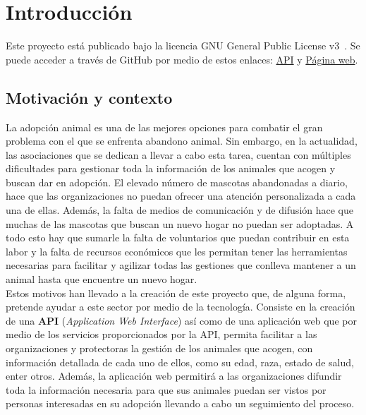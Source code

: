 \chapter{Introducción}\label{ch:introduccion}

Este proyecto está publicado bajo la licencia GNU General Public License v3~\cite{gplv3}.
Se puede acceder a través de GitHub por medio de estos enlaces: \href{https://github.com/Marodseg/confianza-animal-backend}{API}
y \href{https://github.com/Marodseg/confianza-animal-frontend}{Página web}.


\section{Motivación y contexto}\label{sec:motivacion-y-contexto}

La adopción animal es una de las mejores opciones para combatir el gran problema con el que se enfrenta
abandono animal. Sin embargo, en la actualidad, las asociaciones que se dedican a llevar a cabo esta tarea,
cuentan con múltiples dificultades para gestionar toda la información de los animales
que acogen y buscan dar en adopción. El elevado número de mascotas abandonadas a diario, hace que
las organizaciones no puedan ofrecer una atención personalizada a cada una de ellas. Además, la falta de medios
de comunicación y de difusión hace que muchas de las mascotas que buscan un nuevo hogar no
puedan ser adoptadas. A todo esto hay que sumarle la falta de voluntarios que puedan contribuir en esta labor y
la falta de recursos económicos que les permitan tener las herramientas necesarias para facilitar y agilizar
todas las gestiones que conlleva mantener a un animal hasta que encuentre un nuevo hogar. \\

Estos motivos han llevado a la creación de este proyecto que, de alguna forma, pretende ayudar a este sector
por medio de la tecnología. Consiste en la creación de una \textbf{API} (\textit{Application Web Interface}) así como de una aplicación web que por medio de
los servicios proporcionados por la API, permita facilitar a las organizaciones y protectoras la gestión de los
animales que acogen, con información detallada de cada uno de ellos, como su edad, raza, estado de salud, enter otros.
Además, la aplicación web permitirá a las organizaciones difundir toda la información necesaria para que sus animales
puedan ser vistos por personas interesadas en su adopción llevando a cabo un seguimiento del proceso. \\


